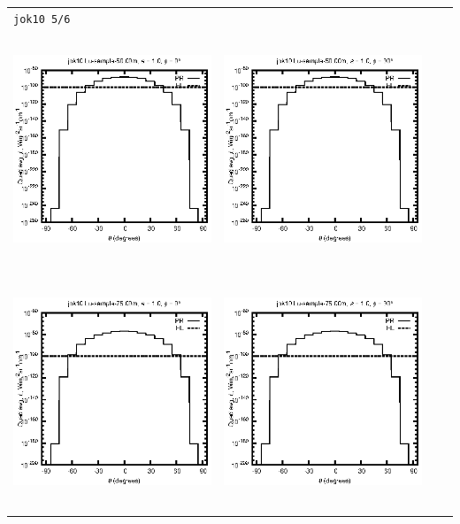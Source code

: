 \documentclass[10pt,a4paper]{article}
\begin{document}
\begin{adjustwidth}{-1.2in}{-1.2in}
\begin{tabular}{c c c c}
\multicolumn{4}{l}{\texttt{jok10 5/6}} \\
\includegraphics[height=7cm]{../eps/jok10_Lu_sample_50.00m_fwd.eps} &
\includegraphics[height=7cm]{../eps/jok10_Lu_sample_50.00m_cross.eps} \\
\includegraphics[height=7cm]{../eps/jok10_Lu_sample_75.00m_fwd.eps} &
\includegraphics[height=7cm]{../eps/jok10_Lu_sample_75.00m_cross.eps} \\

\end{tabular}
\end{adjustwidth}
\end{document}
